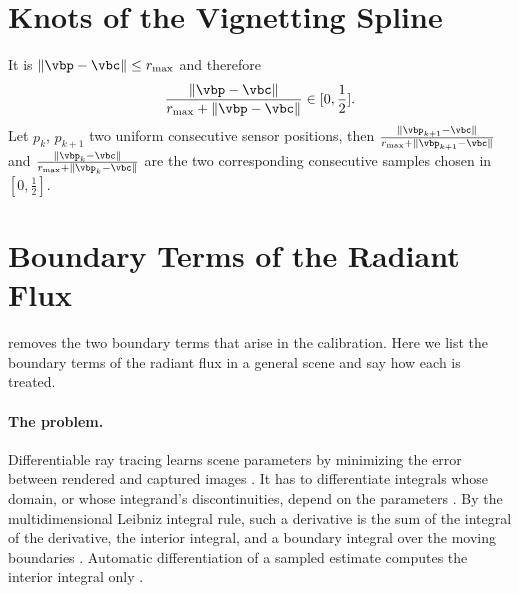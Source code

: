 \section{Knots of the Vignetting Spline}
\label{sec:supp-vignetting-uniform-knots}
It is $\lVert \vbp-\vbc \rVert \leq r_{\max}$ and therefore
\begin{align*}
    \frac{\lVert \vbp - \vbc \rVert}{r_{\max} + \lVert \vbp - \vbc \rVert} \in [0,\frac{1}{2}].
\end{align*}
Let $p_k$, $p_{k+1}$ two uniform consecutive sensor positions, then $\frac{\lVert \vbp_{k+1}-\vbc \rVert}{r_{\max}+\lVert \vbp_{k+1}-\vbc \rVert}$ and $\frac{\lVert \vbp_{k}-\vbc \rVert}{r_{\max}+\lVert \vbp_{k}-\vbc \rVert}$ are the two corresponding consecutive samples chosen in $[0,\frac{1}{2}]$.


\section{Boundary Terms of the Radiant Flux}
\label{sec:supp-boundaries}
 removes the two boundary terms that arise
in the calibration. Here we list the boundary terms of the radiant
flux in a general scene and say how each is treated.

\paragraph{The problem.}
Differentiable ray tracing learns scene parameters by minimizing the
error between rendered and captured images
\cite{NimierDavidVicini2019Mitsuba2, Li:2018:DMC}. It has to
differentiate integrals whose domain, or whose integrand's
discontinuities, depend on the parameters
\cite{Zhang:2020:PSDR, Li:2018:DMC, mitsuba-projective}. By the
multidimensional Leibniz integral rule, such a derivative is the sum
of the integral of the derivative, the interior integral, and a
boundary integral over the moving boundaries
\cite{Casey2012JumpConditions, leibniz-multi-dim, Zhang:2020:PSDR}.
Automatic differentiation of a sampled estimate computes the
interior integral only \cite{Zhang:2020:PSDR, mitsuba-projective}.


